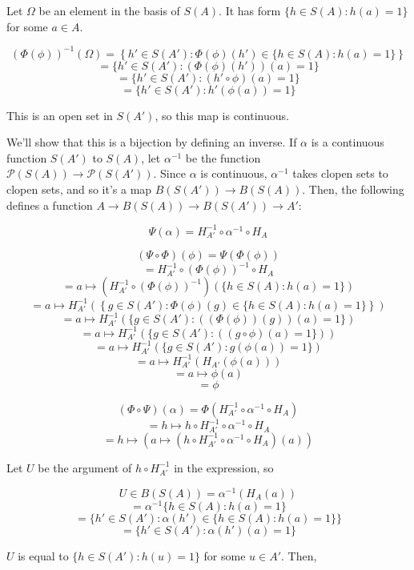 \documentclass{article}
\begin{document}
      Let $\Omega$ be an element in the basis of $S(A)$. It has form $\{h \in
      S(A): h(a) = 1\}$ for some $a \in A$.

      \[(\Phi(\phi))^{-1}(\Omega) = \left\{h' \in S(A') : \Phi(\phi)(h') \in \{h
      \in S(A): h(a) = 1\} \right\}\]
      \[ = \{h' \in S(A') : (\Phi(\phi)(h'))(a) = 1 \}\]
      \[ = \{h' \in S(A') : (h' \circ \phi)(a) = 1 \}\]
      \[ = \{h' \in S(A') : h'(\phi(a)) = 1\}\]

      This is an open set in $S(A')$, so this map is continuous.

      We'll show that this is a bijection by defining an inverse. If $\alpha$ is
      a continuous function $S(A')$ to $S(A)$, let $\alpha^{-1}$  be the
      function $\mathcal{P}(S(A)) \to \mathcal{P}(S(A'))$. Since $\alpha$ is
      continuous, $\alpha^{-1}$ takes clopen sets to clopen sets, and so it's a map
      $B(S(A')) \to B(S(A))$. Then, the following defines a function $A \to
      B(S(A)) \to B(S(A')) \to A'$:

      \[\Psi(\alpha) = H_{A'}^{-1} \circ \alpha^{-1} \circ H_A\]

      \[(\Psi \circ \Phi)(\phi) = \Psi(\Phi(\phi))\]
      \[ = H_{A'}^{-1} \circ (\Phi(\phi))^{-1} \circ H_A \]
      \[ = a \mapsto (H_{A'}^{-1} \circ (\Phi(\phi))^{-1})  \left(\{h \in S(A) : h(a) =
      1 \}\right) \]
      \[ = a \mapsto H_{A'}^{-1} \left( \left\{g \in S(A') : \Phi(\phi)(g) \in \{h \in S(A) : h(a) =
      1 \}\right\} \right) \]
      \[ = a \mapsto H_{A'}^{-1} (\{g \in S(A') : ((\Phi(\phi))(g))(a) = 1 \}) \]
      \[ = a \mapsto H_{A'}^{-1} (\{g \in S(A') : ((g \circ \phi)(a) = 1 \})) \]
      \[ = a \mapsto H_{A'}^{-1} (\{g \in S(A') : g(\phi(a)) = 1 \}) \]
      \[ = a \mapsto H_{A'}^{-1} (H_{A'}(\phi(a))) \]
      \[ = a \mapsto \phi(a)\]
      \[ = \phi\]

      \[(\Phi \circ \Psi)(\alpha) = \Phi(H_{A'}^{-1} \circ \alpha^{-1} \circ
      H_A)\]
      \[= h \mapsto h \circ H_{A'}^{-1} \circ \alpha^{-1} \circ H_A \]
      \[= h \mapsto (a \mapsto (h \circ H_{A'}^{-1} \circ \alpha^{-1} \circ
      H_A)(a)) \]

      Let $U$ be the argument of $h \circ H_{A'}^{-1}$ in the expression, so

      \[U \in B(S(A)) = \alpha^{-1} (H_A (a))\]
      \[ = \alpha^{-1} \{h \in S(A) : h(a) = 1 \}\]
      \[ = \{h' \in S(A') :\alpha(h') \in \{ h \in S(A) : h(a) = 1\} \}\]
      \[ = \{h' \in S(A') : \alpha(h')(a) = 1\} \]


      $U$ is equal to $\{h \in S(A') : h(u) = 1\}$ for some $u \in A'$. Then,
\end{document}
